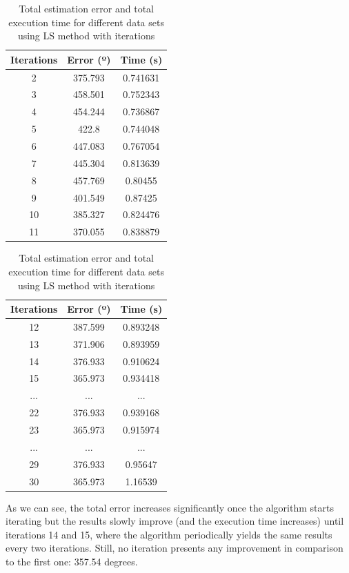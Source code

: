 \begin{table}[h!]
	\centering
	\def\arraystretch{1.2}
	\begin{tabular}{|c c c|} 
		\hline
		Iterations & Error (º) & Time (s) \\ [0.5ex] 
		\hline\hline
		2 & 375.793 & 0.741631 \\
		\hline
		3 & 458.501 & 0.752343 \\
		\hline
		4 & 454.244 & 0.736867 \\
		\hline
		5 & 422.8 & 0.744048 \\
		\hline
		6 & 447.083 & 0.767054 \\
		\hline
		7 & 445.304 & 0.813639 \\
		\hline
		8 & 457.769 & 0.80455 \\
		\hline
		9 & 401.549 & 0.87425 \\
		\hline
		10 & 385.327 & 0.824476 \\
		\hline
		11 & 370.055 & 0.838879 \\
		\hline
	\end{tabular}
	\quad\quad\quad
	\begin{tabular}{|c c c|} 
		\hline
		Iterations & Error (º) & Time (s) \\ [0.3ex] 
		\hline\hline
		12 & 387.599 & 0.893248 \\
		\hline
		13 & 371.906 & 0.893959 \\
		\hline
		14 & 376.933 & 0.910624 \\
		\hline
		15 & 365.973 & 0.934418 \\
		\hline
		... & ... & ... \\
		\hline
		22 & 376.933 & 0.939168 \\
		\hline
		23 & 365.973 & 0.915974 \\
		\hline
		... & ... & ... \\
		\hline
		29 & 376.933 & 0.95647 \\
		\hline
		30 & 365.973 & 1.16539 \\
		\hline
	\end{tabular}
	\caption{Total estimation error and total execution time for different data sets using LS method with iterations}
\end{table}

As we can see, the total error increases significantly once the algorithm starts iterating but the results slowly improve (and the execution time increases) until iterations 14 and 15, where the algorithm periodically yields the same results every two iterations. Still, no iteration presents any improvement in comparison to the first one: 357.54 degrees.

